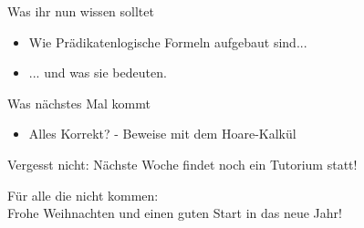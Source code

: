 


\begin{frame}	
	\begin{block}{Was ihr nun wissen solltet}
		\begin{itemize}
			\item Wie Prädikatenlogische Formeln aufgebaut sind...
			\item ... und was sie bedeuten.
		\end{itemize}
	\end{block}
	
	\begin{block}{Was nächstes Mal kommt}
		\begin{itemize}
			\item Alles Korrekt? - Beweise mit dem Hoare-Kalkül
		\end{itemize}
	\end{block}
\end{frame}

\begin{frame}[plain]
	\begin{center}
		\large
		Vergesst nicht: Nächste Woche findet noch ein Tutorium statt!
	\end{center}
	\bigskip
	Für alle die nicht kommen: \\
	Frohe Weihnachten und einen guten Start in das neue Jahr!
\end{frame}

\slideThanks

